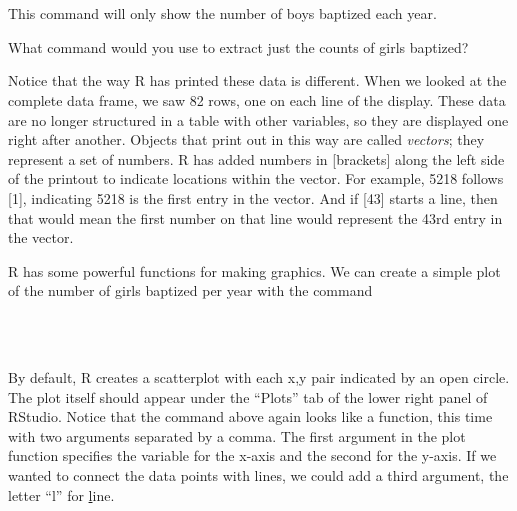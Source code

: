 \documentclass[11pt]{article}
\begin{document}
\ttfamily
\hlstd{}\hspace*{\fill}\\
\hlstd{}\hlkeyword{(}\hlkeyword{)}\hspace*{\fill}\\
\normalfont

This command will only show the number of boys baptized each year.

\begin{exercise}
What command would you use to extract just the counts of girls baptized?
\end{exercise}

Notice that the way R has printed these data is different. When we looked at the complete data frame, we saw 82 rows, one on each line of the display. These data are no longer structured in a table with other variables, so they are displayed one right after another. Objects that print out in this way are called \emph{vectors}; they represent a set of numbers. R has added numbers in [brackets] along the left side of the printout to indicate locations within the vector. For example, 5218 follows [1], indicating 5218 is the first entry in the vector. And if [43] starts a line, then that would mean the first number on that line would represent the 43rd entry in the vector.

R has some powerful functions for making graphics. We can create a simple plot of the number of girls baptized per year with the command

\ttfamily
\hlstd{}\hspace*{\fill}\\
\hlstd{}\hlkeyword{(}\hlargument{=}{\ }\hlkeyword{\usebox{\hlnormalsizeboxdollar}}\hlkeyword{,}{\ }\hlargument{=}{\ }\hlkeyword{\usebox{\hlnormalsizeboxdollar}}\hlkeyword{)}\hspace*{\fill}\\
\normalfont

By default, R creates a scatterplot with each x,y pair indicated by an open circle. The plot itself should appear under the ``Plots'' tab of the lower right panel of RStudio. Notice that the command above again looks like a function, this time with two arguments separated by a comma.  The first argument in the plot function specifies the variable for the x-axis and the second for the y-axis. If we wanted to connect the data points with lines, we could add a third argument, the letter ``l'' for \underline{l}ine.
\end{document}
